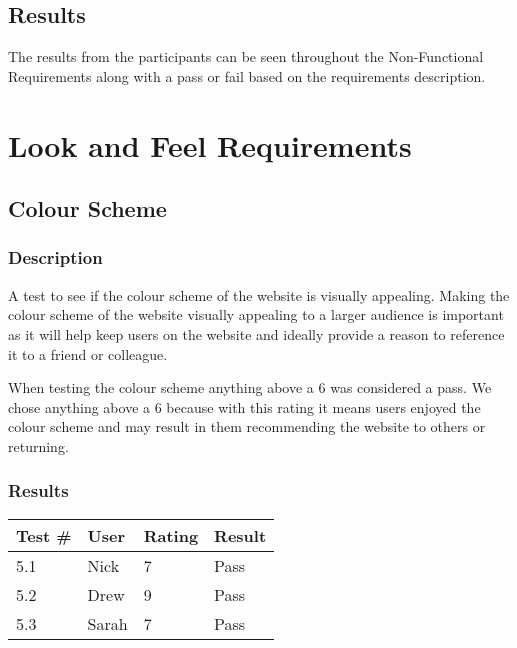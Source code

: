 \documentclass{scrreprt}
\begin{document}
\subsection{Results}

The results from the participants can be seen throughout the Non-Functional
Requirements along with a pass or fail based on the requirements description.

\section{Look and Feel Requirements}
\subsection{Colour Scheme}
\subsubsection{Description}

A test to see if the colour scheme of the website is visually appealing. Making the colour scheme of the website visually appealing to a larger audience is important as it will help keep users on the website and ideally provide a reason to reference it to a friend or colleague.

When testing the colour scheme anything above a 6 was considered a pass. We chose anything above a 6 because with this rating it means users enjoyed the colour scheme and may result in them recommending the website to others or returning.

\subsubsection{Results}

\begin{table}[H]
        \centering
        \begin{tabular}{||p{0.75cm}|p{2.5cm}|p{2.5cm}|p{2.5cm}||}
                \hline
                \textbf Test \# & \textbf User & \textbf Rating & \textbf Result\\
                \hline\hline
                5.1 & Nick & 7 & Pass \\
                \hline
                5.2 & Drew & 9 & Pass\\ %
                \hline
                5.3 & Sarah & 7 & Pass \\
                \hline
        \end{tabular}
\end{table}
\end{document}
